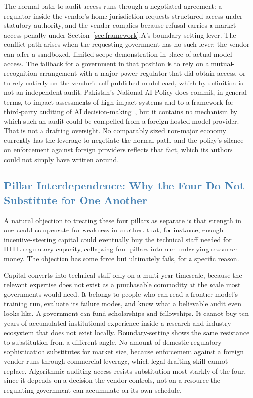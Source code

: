 \documentclass[journal]{IEEEtran}
\begin{document}
The normal path to audit access runs through a negotiated agreement: a regulator inside the vendor's home jurisdiction requests structured access under statutory authority, and the vendor complies because refusal carries a market-access penalty under Section~\ref{sec:framework}.A's boundary-setting lever. The conflict path arises when the requesting government has no such lever: the vendor can offer a sandboxed, limited-scope demonstration in place of actual model access.
The fallback for a government in that position is to rely on a mutual-recognition arrangement with a major-power regulator that did obtain access, or to rely entirely on the vendor's self-published model card, which by definition is not an independent audit. Pakistan's National AI Policy does commit, in general terms, to impact assessments of high-impact systems and to a framework for third-party auditing of AI decision-making~\cite{pakistan2025nationalaipolicy}, but it contains no mechanism by which such an audit could be compelled from a foreign-hosted model provider.
That is not a drafting oversight. No comparably sized non-major economy currently has the leverage to negotiate the normal path, and the policy's silence on enforcement against foreign providers reflects that fact, which its authors could not simply have written around.

\subsection{\textcolor{steelblue}{Pillar Interdependence: Why the Four Do Not Substitute for One Another}}

A natural objection to treating these four pillars as separate is that strength in one could compensate for weakness in another: that, for instance, enough incentive-steering capital could eventually buy the technical staff needed for HITL regulatory capacity, collapsing four pillars into one underlying resource: money. The objection has some force but ultimately fails, for a specific reason.

Capital converts into technical staff only on a multi-year timescale, because the relevant expertise does not exist as a purchasable commodity at the scale most governments would need. It belongs to people who can read a frontier model's training run, evaluate its failure modes, and know what a believable audit even looks like. A government can fund scholarships and fellowships. It cannot buy ten years of accumulated institutional experience inside a research and industry ecosystem that does not exist locally. Boundary-setting shows the same resistance to substitution from a different angle. No amount of domestic regulatory sophistication substitutes for market size, because enforcement against a foreign vendor runs through commercial leverage, which legal drafting skill cannot replace. Algorithmic auditing access resists substitution most starkly of the four, since it depends on a decision the vendor controls, not on a resource the regulating government can accumulate on its own schedule.
\end{document}
